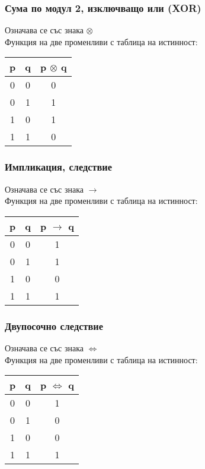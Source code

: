 \documentclass[fleqn, 12pt]{article}
\theoremstyle{definition}
\begin{document}
\newpage

\subsubsection{Сума по модул 2, изключващо или (XOR)}
Означава се със знака $\otimes$\\
Функция на две променливи с таблица на истинност: 
\begin{table}[htp]
  \begin{center}
    \begin{tabular}{|c|c|c|} 
\hline
      \textbf{p} & \textbf{q}  & \textbf{p $\otimes$ q} \\
      \hline
	0 & 0 & 0 \\
\hline
	0 & 1 & 1 \\
\hline
	1 & 0 & 1 \\
\hline
 	1 & 1 & 0 \\
\hline
    \end{tabular}
  \end{center}
\end{table}

\subsubsection{Импликация, следствие }
Означава се със знака $\to$\\
Функция на две променливи с таблица на истинност: 
\begin{table}[htp]
  \begin{center}
    \begin{tabular}{|c|c|c|} 
\hline
      \textbf{p} & \textbf{q}  & \textbf{p $\to$ q} \\
\hline
	0 & 0 & 1 \\
 \hline
	0 & 1 & 1 \\ 
\hline
	1 & 0 & 0 \\ 
\hline
 	1 & 1 & 1 \\ 
\hline
    \end{tabular}
  \end{center}
\end{table}

\subsubsection{Двупосочно следствие}
Означава се със знака $\Leftrightarrow$\\
Функция на две променливи с таблица на истинност: 
\begin{table}[htp]
  \begin{center}
    \begin{tabular}{|c|c|c|} 
\hline
      \textbf{p} & \textbf{q}  & \textbf{p $\Leftrightarrow$ q} \\
\hline
	0 & 0 & 1 \\
\hline
	0 & 1 & 0 \\
\hline
	1 & 0 & 0 \\
\hline
 	1 & 1 & 1 \\
\hline
    \end{tabular}
  \end{center}
\end{table}
\end{document}
